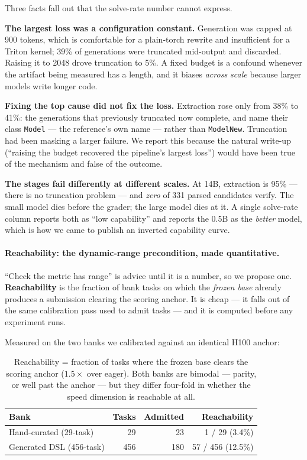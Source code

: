 \noindent Three facts fall out that the solve-rate number cannot express.

\textbf{The largest loss was a configuration constant.} Generation was capped at 900 tokens,
which is comfortable for a plain-torch rewrite and insufficient for a Triton kernel; 39\% of
generations were truncated mid-output and discarded. Raising it to 2048 drove truncation to 5\%.
A fixed budget is a confound whenever the artifact being measured has a length, and it biases
\emph{across scale} because larger models write longer code.

\textbf{Fixing the top cause did not fix the loss.} Extraction rose only from 38\% to 41\%: the
generations that previously truncated now complete, and name their class \texttt{Model} --- the
reference's own name --- rather than \texttt{ModelNew}. Truncation had been masking a larger
failure. We report this because the natural write-up (``raising the budget recovered the
pipeline's largest loss'') would have been true of the mechanism and false of the outcome.

\textbf{The stages fail differently at different scales.} At 14B, extraction is 95\% --- there
is no truncation problem --- and \emph{zero} of 331 parsed candidates verify. The small model
dies before the grader; the large model dies at it. A single solve-rate column reports both as
``low capability'' and reports the 0.5B as the \emph{better} model, which is how we came to
publish an inverted capability curve.

\paragraph{Reachability: the dynamic-range precondition, made quantitative.}
``Check the metric has range'' is advice until it is a number, so we propose one.
\textbf{Reachability} is the fraction of bank tasks on which the \emph{frozen base} already
produces a submission clearing the scoring anchor. It is cheap --- it falls out of the same
calibration pass used to admit tasks --- and it is computed before any experiment runs.

Measured on the two banks we calibrated against an identical H100 anchor:

\begin{table}[h]
\centering\small
\begin{tabular}{@{}lrrr@{}}
\toprule
\textbf{Bank} & \textbf{Tasks} & \textbf{Admitted} & \textbf{Reachability} \\
\midrule
Hand-curated (29-task) & 29 & 23 & 1 / 29 \quad(3.4\%) \\
Generated DSL (456-task) & 456 & 180 & 57 / 456 \quad(12.5\%) \\
\bottomrule
\end{tabular}
\caption{Reachability = fraction of tasks where the frozen base clears the scoring anchor
($1.5\times$ over eager). Both banks are bimodal --- parity, or well past the anchor --- but
they differ four-fold in whether the speed dimension is reachable at all.}
\label{tab:reach}
\end{table}

